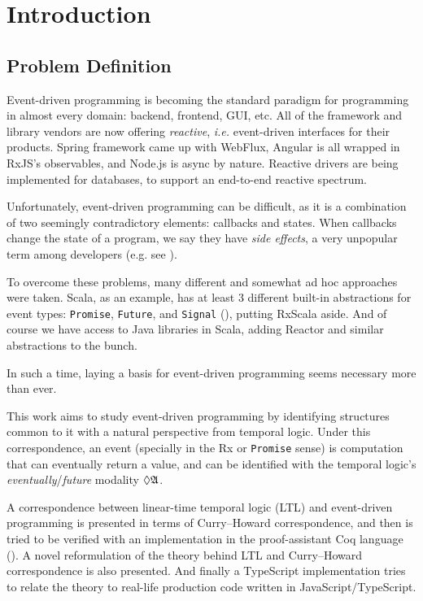 \chapter{Introduction}\label{chap:introduction}

\section{Problem Definition}

Event-driven programming is becoming the standard paradigm for programming in almost every domain: backend, frontend, GUI, etc. All of the framework and library vendors are now offering \textit{reactive}, \textit{i.e.} event-driven interfaces for their products. Spring framework came up with WebFlux, Angular is all wrapped in RxJS's observables, and Node.js is async by nature. Reactive drivers are being implemented for databases, to support an end-to-end reactive spectrum.

Unfortunately, event-driven programming can be difficult, as it is a combination of two seemingly contradictory elements: callbacks and states. When callbacks change the state of a program, we say they have \textit{side effects}, a very unpopular term among developers (e.g. see \cite{aerabi_2020}).

To overcome these problems, many different and somewhat ad hoc approaches were taken. Scala, as an example, has at least 3 different built-in abstractions for event types: \texttt{Promise}, \texttt{Future}, and \texttt{Signal} (\cite{deprecating2010}), putting RxScala aside. And of course we have access to Java libraries in Scala, adding Reactor and similar abstractions to the bunch.

In such a time, laying a basis for event-driven programming seems necessary more than ever.

This work aims to study event-driven programming by identifying structures common to it with a natural perspective from temporal logic. Under this correspondence, an event (specially in the Rx or \texttt{Promise} sense) is computation that can eventually return a value, and can be identified with the temporal logic's \textit{eventually}/\textit{future} modality $\lozenge\mathfrak{A}$.

A correspondence between linear-time temporal logic (LTL) and event-driven programming is presented in terms of Curry--Howard correspondence, and then is tried to be verified with an implementation in the proof-assistant Coq language (\cite{mohammad_ali_a_rabi_2021_4749276}). A novel reformulation of the theory behind LTL and Curry--Howard correspondence is also presented. And finally a TypeScript implementation tries to relate the theory to real-life production code written in JavaScript/TypeScript.

